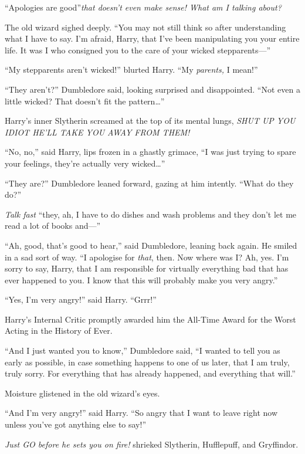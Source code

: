 ``Apologies are good''\emph{that doesn't even make sense! What am I
talking about?}

The old wizard sighed deeply. ``You may not still think so after
understanding what I have to say. I'm afraid, Harry, that I've been
manipulating you your entire life. It was I who consigned you to the
care of your wicked stepparents---''

``My stepparents aren't wicked!'' blurted Harry. ``My \emph{parents,} I
mean!''

``They aren't?'' Dumbledore said, looking surprised and disappointed.
``Not even a little wicked? That doesn't fit the pattern\ldots{}''

Harry's inner Slytherin screamed at the top of its mental lungs,
\emph{SHUT UP YOU IDIOT HE'LL TAKE YOU AWAY FROM THEM!}

``No, no,'' said Harry, lips frozen in a ghastly grimace, ``I was just
trying to spare your feelings, they're actually very wicked\ldots{}''

``They are?'' Dumbledore leaned forward, gazing at him intently. ``What
do they do?''

\emph{Talk fast} ``they, ah, I have to do dishes and wash problems and
they don't let me read a lot of books and---''

``Ah, good, that's good to hear,'' said Dumbledore, leaning back again.
He smiled in a sad sort of way. ``I apologise for \emph{that}, then. Now
where was I? Ah, yes. I'm sorry to say, Harry, that I am responsible for
virtually everything bad that has ever happened to you. I know that this
will probably make you very angry.''

``Yes, I'm very angry!'' said Harry. ``Grrr!''

Harry's Internal Critic promptly awarded him the All-Time Award for the
Worst Acting in the History of Ever.

``And I just wanted you to know,'' Dumbledore said, ``I wanted to tell
you as early as possible, in case something happens to one of us later,
that I am truly, truly sorry. For everything that has already happened,
and everything that will.''

Moisture glistened in the old wizard's eyes.

``And I'm very angry!'' said Harry. ``So angry that I want to leave
right now unless you've got anything else to say!''

\emph{Just GO before he sets you on fire!} shrieked Slytherin,
Hufflepuff, and Gryffindor.

